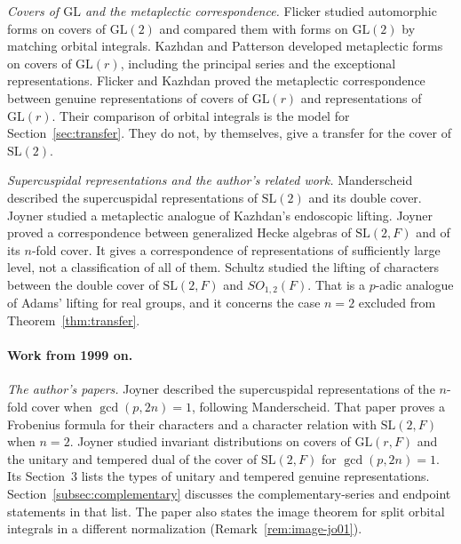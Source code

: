 \documentclass[12pt,letterpaper]{article}
\numberwithin{equation}{section}
\theoremstyle{plain}
\theoremstyle{definition}
\theoremstyle{remark}
\newcommand{\SL}{\mathrm{SL}}
\newcommand{\GL}{\mathrm{GL}}
\begin{document}
\emph{Covers of $\GL$ and the metaplectic correspondence.}
Flicker \cite{Fl80} studied automorphic forms on covers of $\GL(2)$
and compared them with forms on $\GL(2)$ by matching orbital
integrals. Kazhdan and Patterson \cite{KP84} developed metaplectic
forms on covers of $\GL(r)$, including the principal series and the
exceptional representations. Flicker and Kazhdan \cite{FK86} proved
the metaplectic correspondence between genuine representations of
covers of $\GL(r)$ and representations of $\GL(r)$. Their comparison
of orbital integrals is the model for Section~\ref{sec:transfer}. They
do not, by themselves, give a transfer for the cover of $\SL(2)$.

\emph{Supercuspidal representations and the author's related
work.} Manderscheid \cite{Ma84a,Ma84b} described the supercuspidal
representations of $\SL(2)$ and its double cover. Joyner \cite{Jo88}
studied a metaplectic analogue of Kazhdan's endoscopic lifting.
Joyner \cite{Jo98} proved a correspondence between generalized Hecke
algebras of $\SL(2,F)$ and of its $n$-fold cover. It gives a
correspondence of representations of sufficiently large level, not a
classification of all of them. Schultz \cite{Sc98} studied the lifting
of characters between the double cover of $\SL(2,F)$ and
$SO_{1,2}(F)$. That is a $p$-adic analogue of Adams' lifting for real
groups, and it concerns the case $n=2$ excluded from
Theorem~\ref{thm:transfer}.

\paragraph{Work from 1999 on.}
\emph{The author's papers.} Joyner \cite{Jo99} described the
supercuspidal representations of the $n$-fold cover when
$\gcd(p,2n)=1$, following Manderscheid. That paper proves a Frobenius
formula for their characters and a character relation with $\SL(2,F)$
when $n=2$. Joyner \cite{Jo01} studied invariant distributions on
covers of $\GL(r,F)$ and the unitary and tempered dual of the cover of
$\SL(2,F)$ for $\gcd(p,2n)=1$. Its Section~3 lists the types of
unitary and tempered genuine representations.
Section~\ref{subsec:complementary} discusses the complementary-series
and endpoint statements in that list. The paper also states the image
theorem for split orbital integrals in a different normalization
(Remark~\ref{rem:image-jo01}).
\end{document}

